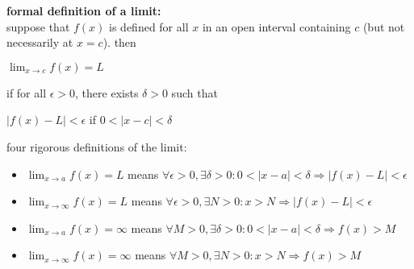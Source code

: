 \documentclass{article}
\begin{document}
\textbf{formal definition of a limit:}\\
suppose that $f(x)$ is defined for all $x$ in an open interval containing $c$ (but not necessarily at $x = c$). then
\begin{center}$\lim_{x \to c}f(x) = L$\end{center}
if for all $\epsilon > 0$, there exists $\delta > 0$ such that
\begin{center}$\lvert f(x) - L\rvert < \epsilon$ if $0 < \lvert x - c\rvert < \delta$\end{center}

four rigorous definitions of the limit:
	\begin{itemize}
		\item $\lim_{x \to a}f(x) = L$ means $\forall \epsilon > 0, \exists \delta > 0 : 0 < \lvert x - a\rvert < \delta \Rightarrow \lvert f(x) - L\rvert < \epsilon$
		\item $\lim_{x \to \infty}f(x) = L$ means $\forall \epsilon > 0, \exists N > 0 : x > N \Rightarrow \lvert f(x) - L\rvert < \epsilon$   
		\item $\lim_{x \to a}f(x) = \infty$ means $\forall M > 0, \exists \delta > 0 : 0 < \lvert x - a\rvert < \delta \Rightarrow f(x) > M$  
		\item $\lim_{x \to \infty}f(x) = \infty$ means $\forall M > 0, \exists N > 0 : x > N \Rightarrow f(x) > M$
	\end{itemize}
\end{document}
